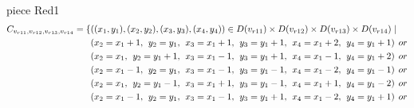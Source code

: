 \\ piece Red1 
\begin{align*}
\Const{r11}{r12}{r13}{r14}=\{&((x_{1},y_{1}),(x_{2},y_{2}),(x_{3},y_{3}),(x_{4},y_{4}))\in \Domain{r11}\times \Domain{r12}\times\Domain{r13}\times\Domain{r14}\mid\\
&(x_{2} = x_{1} + 1,\hspace{1ex}y_{2} = y_{1},\hspace{1ex}x_{3} = x_{1} + 1, \hspace{1ex}y_{3} = y_{1}+1,\hspace{1ex}x_{4} = x_{1}+2,\hspace{1ex}y_{4} = y_{1}+1)\hspace{1ex} or\\
&(x_{2} = x_{1},\hspace{1ex}y_{2} = y_{1}+1,\hspace{1ex}x_{3} = x_{1}-1, \hspace{1ex}y_{3} = y_{1}+1,\hspace{1ex}x_{4} = x_{1}-1,\hspace{1ex}y_{4} = y_{1}+2)\hspace{1ex} or\\
&(x_{2} = x_{1}-1,\hspace{1ex}y_{2} = y_{1},\hspace{1ex}x_{3} = x_{1}-1,\hspace{1ex} y_{3} = y_{1}-1,\hspace{1ex}x_{4} = x_{1}-2,\hspace{1ex}y_{4} = y_{1}-1)\hspace{1ex} or\\
&(x_{2} = x_{1},\hspace{1ex}y_{2} = y_{1}-1,\hspace{1ex}x_{3} = x_{1}+1, \hspace{1ex}y_{3} = y_{1}-1,\hspace{1ex}x_{4} = x_{1}+1,\hspace{1ex}y_{4} = y_{1}-2)\hspace{1ex} or\\
&(x_{2} = x_{1}-1,\hspace{1ex}y_{2} = y_{1},\hspace{1ex}x_{3} = x_{1}-1, \hspace{1ex}y_{3} = y_{1}+1,\hspace{1ex}x_{4} = x_{1}-2,\hspace{1ex}y_{4} = y_{1}+1)\hspace{1ex} or\\

\end{align*}

